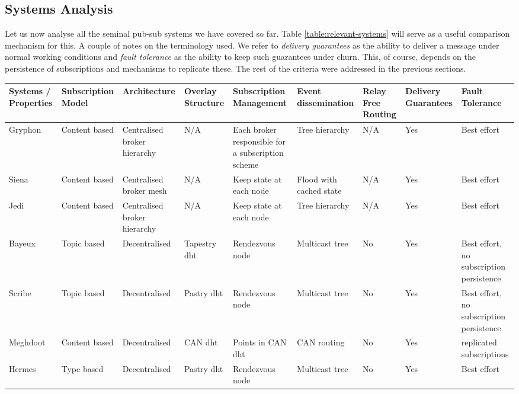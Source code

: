 \subsection{Systems Analysis}\label{systems-overview}

Let us now analyse all the seminal pub-sub systems we have covered so far.
Table \ref{table:relevant-systems} will serve as a useful comparison mechanism
for this. A couple of notes on the terminology used. We refer to \emph{delivery
guarantees} as the ability to deliver a message under normal working conditions
and \emph{fault tolerance} as the ability to keep such guarantees under churn.
This, of course, depends on the persistence of subscriptions and mechanisms to
replicate these. The rest of the criteria were addressed in the previous
sections.

\begin{table}
  \center
    \begin{tabular}{|P{3cm}|P{2cm}P{2cm}P{2cm}P{2.5cm}P{2cm}P{2cm}P{2cm}P{2cm}|}\hline
    Systems / Properties & Subscription Model & Architecture & Overlay Structure & Subscription Management & Event dissemination & Relay Free Routing & Delivery Guarantees & Fault Tolerance \\\hline\hline
    Gryphon \cite{Strom1998} & Content based & Centralised broker hierarchy & N/A & Each broker responsible for a subscription scheme & Tree hierarchy & N/A & Yes & Best effort \\\hline
    Siena \cite{Carzaniga2003} & Content based & Centralised broker mesh & N/A & Keep state at each node & Flood with cached state & N/A & Yes & Best effort \\\hline
    Jedi \cite{Cugola2001} & Content based & Centralised broker hierarchy & N/A & Keep state at each node & Tree hierarchy & N/A & Yes & Best effort \\\hline
    Bayeux \cite{Zhuang2001} & Topic based & Decentralised & Tapestry \acrshort{dht} & Rendezvous node & Multicast tree & No & Yes & Best effort, no subscription persistence \\\hline
    Scribe \cite{Castro2002} & Topic based & Decentralised & Pastry \acrshort{dht} & Rendezvous node & Multicast tree & No & Yes & Best effort, no subscription persistence \\\hline
    Meghdoot \cite{Gupta2004} & Content based & Decentralised & CAN \acrshort{dht} & Points in CAN \acrshort{dht} & CAN routing  & No & Yes & replicated subscriptions \\\hline
    Hermes \cite{Pietzuch2002} & Type based & Decentralised & Pastry \acrshort{dht} & Rendezvous node & Multicast tree & No & Yes & Best effort \\\hline

\end{tabular}
\end{table}
